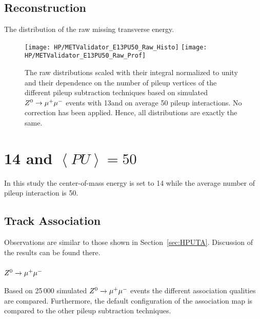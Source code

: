 \subsection{\texorpdfstring{\MET{}}{MET} Reconstruction  \label{sec:HPUAppE13PU50MC}}

The distribution of the raw missing transverse energy. 

\begin{figure}[h!t]
  \centering
  \texttt{[image: HP/METValidator\_E13PU50\_Raw\_Histo]}
  \texttt{[image: HP/METValidator\_E13PU50\_Raw\_Prof]}
  \caption[The raw \MET{} distributions and their dependence on the number of pileup vertices for different pileup subtraction techniques based on simulated  $\Zz\rightarrow\MM$ events with 13\TeV and PU=50]{The raw \MET{} distributions scaled with their integral normalized to unity and their dependence on the number of pileup vertices of the different pileup subtraction techniques based on simulated  $\Zz\rightarrow\MM$ events with 13\TeV and on average 50 pileup interactions. No correction has been applied. Hence, all distributions are exactly the same.}
\end{figure}

\section{\texorpdfstring{14\TeV{}}{14 TeV} and \texorpdfstring{$\left<PU\right>=50$}{<PU>=50}}

In this study the center-of-mass energy is set to 14\TeV{} while the average number of pileup interaction is 50.

\subsection{Track Association \label{sec:HPUAppE14PU50TA}}

Observations are similar to those shown in Section~\ref{sec:HPUTA}. Discussion of the results can be found there.

\subsubsection{$\Zz\rightarrow\MM$}

Based on 25\,000 simulated $\Zz\rightarrow\MM$ events the different association qualities are compared. Furthermore, the default configuration of the association map is compared to the other pileup subtraction techniques.

